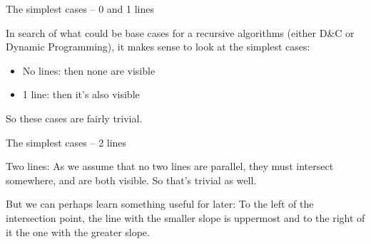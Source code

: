 \documentclass{article}
\begin{document}
\begin{frame}{The simplest cases -- 0 and 1 lines}

In search of what could be base cases for a recursive algorithms
(either D\&C or Dynamic Programming), it makes sense to look at the
simplest cases:

\begin{itemize}
\item No lines: then none are visible
\item 1 line: then it's also visible
\end{itemize}
So these cases are fairly trivial.
\end{frame}

\begin{frame}{The simplest cases -- 2 lines}

Two lines: As we assume that no two lines are parallel, they must
intersect somewhere, and are both visible. So that's trivial as well.


But we can perhaps learn something useful for later: To the left of
the intersection point, the line with the smaller slope is uppermost
and to the right of it the one with the greater slope.
\end{frame}
\end{document}
